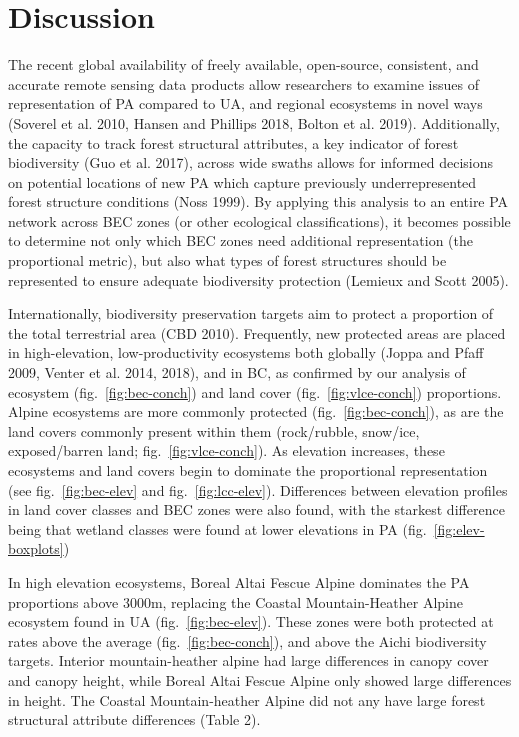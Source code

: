 \documentclass[10pt,oneside]{article}
\begin{document}
\hypertarget{discussion}{%
\section{Discussion}\label{discussion}}

The recent global availability of freely available, open-source,
consistent, and accurate remote sensing data products allow researchers
to examine issues of representation of PA compared to UA, and regional
ecosystems in novel ways (Soverel et al. 2010, Hansen and Phillips 2018,
Bolton et al. 2019). Additionally, the capacity to track forest
structural attributes, a key indicator of forest biodiversity (Guo et
al. 2017), across wide swaths allows for informed decisions on potential
locations of new PA which capture previously underrepresented forest
structure conditions (Noss 1999). By applying this analysis to an entire
PA network across BEC zones (or other ecological classifications), it
becomes possible to determine not only which BEC zones need additional
representation (the proportional metric), but also what types of forest
structures should be represented to ensure adequate biodiversity
protection (Lemieux and Scott 2005).

Internationally, biodiversity preservation targets aim to protect a
proportion of the total terrestrial area (CBD 2010). Frequently, new
protected areas are placed in high-elevation, low-productivity
ecosystems both globally (Joppa and Pfaff 2009, Venter et al. 2014,
2018), and in BC, as confirmed by our analysis of ecosystem
(fig.~\ref{fig:bec-conch}) and land cover (fig.~\ref{fig:vlce-conch})
proportions. Alpine ecosystems are more commonly protected
(fig.~\ref{fig:bec-conch}), as are the land covers commonly present
within them (rock/rubble, snow/ice, exposed/barren land;
fig.~\ref{fig:vlce-conch}). As elevation increases, these ecosystems and
land covers begin to dominate the proportional representation (see
fig.~\ref{fig:bec-elev} and fig.~\ref{fig:lcc-elev}). Differences
between elevation profiles in land cover classes and BEC zones were also
found, with the starkest difference being that wetland classes were
found at lower elevations in PA (fig.~\ref{fig:elev-boxplots})

In high elevation ecosystems, Boreal Altai Fescue Alpine dominates the
PA proportions above 3000m, replacing the Coastal Mountain-Heather
Alpine ecosystem found in UA (fig.~\ref{fig:bec-elev}). These zones were
both protected at rates above the average (fig.~\ref{fig:bec-conch}),
and above the Aichi biodiversity targets. Interior mountain-heather
alpine had large differences in canopy cover and canopy height, while
Boreal Altai Fescue Alpine only showed large differences in height. The
Coastal Mountain-heather Alpine did not any have large forest structural
attribute differences (Table 2).
\end{document}
